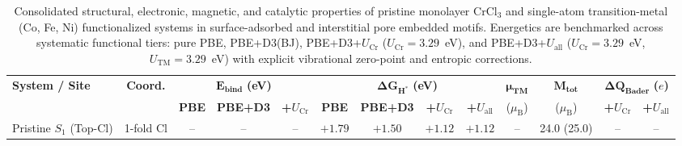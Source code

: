 \documentclass[journal=jacsat,manuscript=article]{achemso}
\begin{document}
{  \begin{table}[htbp]
    \centering
    \small
    \color{revcolor}
    \caption{{\color{revcolor}%
        Consolidated structural, electronic, magnetic, and catalytic properties of pristine monolayer $\text{CrCl}_3$ and single-atom transition-metal (Co, Fe, Ni) functionalized systems in surface-adsorbed and interstitial pore embedded motifs. Energetics are benchmarked across systematic functional tiers: pure PBE, PBE+D3(BJ), PBE+D3+$U_{\text{Cr}}$ ($U_{\text{Cr}} = 3.29$~eV), and PBE+D3+$U_{\text{all}}$ ($U_{\text{Cr}} = 3.29$~eV, $U_{\text{TM}} = 3.29$~eV) with explicit vibrational zero-point and entropic corrections.
    }}
    \label{tab:consolidated_properties}
    \vspace{0.2cm}
    \begin{adjustbox}{max width=\textwidth}
      \begin{tabular}{lcccccccccccc}
        \toprule
        \textbf{System / Site}           & \textbf{Coord.} & \multicolumn{3}{c}{$\boldsymbol{E_{\text{bind}}}$ \textbf{(eV)}} & \multicolumn{4}{c}{$\boldsymbol{\Delta G_{\text{H}^*}}$ \textbf{(eV)}} & $\boldsymbol{\mu_{\text{TM}}}$ & $\boldsymbol{M_{\text{tot}}}$ & \multicolumn{2}{c}{$\boldsymbol{\Delta Q_{\text{Bader}}}$ \textbf{($e$)}}                                                                                                                                                             \\
        \cmidrule(lr){3-5} \cmidrule(lr){6-9} \cmidrule(lr){12-13}
        &                 & \textbf{PBE}                                                     & \textbf{PBE+D3}                                                        & \textbf{+$U_{\text{Cr}}$}      & \textbf{PBE}                  & \textbf{PBE+D3}                                                           & \textbf{+$U_{\text{Cr}}$} & \textbf{+$U_{\text{all}}$} & ($\mu_{\text{B}}$) & ($\mu_{\text{B}}$) & \textbf{+$U_{\text{Cr}}$} & \textbf{+$U_{\text{all}}$} \\
        \midrule
        Pristine $S_1$ (Top-Cl)          & 1-fold Cl       & --                                                               & --                                                                     & --                             & $+1.79$                       & $+1.50$                                                                   & $+1.12$                   & $+1.12$                    & --                 & 24.0 (25.0)        & --                        & --                         \\

\end{tabular}
\end{adjustbox}
\end{table}}
\end{document}
